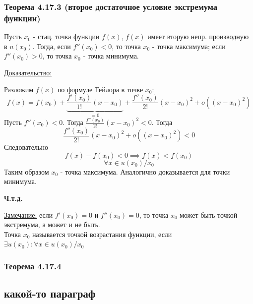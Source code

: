 \documentclass[12pt]{article}
\begin{document}
    \subsubsection*{Теорема 4.17.3 (второе достаточное условие экстремума функции)}\label{th:4.17.3}
    Пусть $x_0$ - стац. точка функции $f(x)$, $f(x)$ имеет вторую непр. производную в $u(x_0)$. Тогда, если $f''(x_0) < 0$, то точка $x_0$ - точка максимума; если $f''(x_0) > 0$, то точка $x_0$ - точка минимума.\par\noindent
    \underline{Доказательство:}
    \begin{adjustwidth}{1.5em}{1.5em}
        Разложим $f(x)$ по формуле Тейлора в точке $x_0$:
        \[ f(x) = f(x_0) + \underbrace{\frac{f'(x_0)}{1!}(x-x_0)}_{= 0} + \frac{f''(x_0)}{2!}(x-x_0)^2 + o((x-x_0)^2) \]
        Пусть $f''(x_0) < 0$. Тогда $\frac{f''(x_0)}{2!}(x-x_0)^2 < 0$. Тогда
        \[ \frac{f''(x_0)}{2!}(x-x_0)^2 + o((x-x_0)^2) < 0 \]
        Следовательно
        \[ f(x) - f(x_0) < 0 \implies f(x) < f(x_0) \]
        \[ \forall x \in u(x_0)/x_0 \]
        Таким образом $x_0$ - точка максимума.
        Аналогично доказывается для точки минимума.
        \begin{center}
            \textbf{Ч.т.д.}
        \end{center}
    \end{adjustwidth}
    \underline{Замечание:} если $f'(x_0) = 0$ и $f''(x_0) = 0$, то точка $x_0$ может быть точкой экстремума, а может и не быть.\\
    Точка $x_0$ называется точкой возрастания функции, если $\exists u(x_0) : \forall x \in u(x_0)/x_0$ %
    \subsubsection*{Теорема 4.17.4}\label{th:4.17.4}
    \par\noindent

    \subsection{какой-то параграф}
\end{document}
